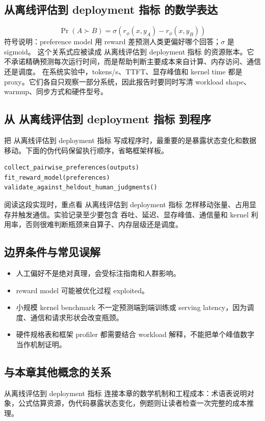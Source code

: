 \documentclass[a4paper]{article}
\begin{document}
\subsection{从离线评估到 deployment 指标 的数学表达}
\[\Pr(A\succ B)=\sigma(r_\phi(x,y_A)-r_\phi(x,y_B))\]
符号说明：preference model 用 reward 差预测人类更偏好哪个回答；\(\sigma\) 是 sigmoid。
这个关系式应被读成 从离线评估到 deployment 指标 的资源账本。它不承诺精确预测每次运行时间，而是帮助判断主要成本来自计算、内存访问、通信还是调度。
在系统实验中，tokens/s、TTFT、显存峰值和 kernel time 都是 proxy。它们各自只观察一部分系统，因此报告时要同时写清 workload shape、warmup、同步方式和硬件型号。
\subsection{从 从离线评估到 deployment 指标 到程序}
把 从离线评估到 deployment 指标 写成程序时，最重要的是暴露状态变化和数据移动。下面的伪代码保留执行顺序，省略框架样板。
\begin{lstlisting}[language=Python]
collect_pairwise_preferences(outputs)
fit_reward_model(preferences)
validate_against_heldout_human_judgments()
\end{lstlisting}
阅读这段实现时，重点看 从离线评估到 deployment 指标 怎样移动张量、占用显存并触发通信。实验记录至少要包含 吞吐、延迟、显存峰值、通信量和 kernel 利用率，否则很难判断瓶颈来自算子、内存层级还是调度。
\subsection{边界条件与常见误解}
\begin{itemize}
\item 人工偏好不是绝对真理，会受标注指南和人群影响。
\item reward model 可能被优化过程 exploited。
\item 小规模 kernel benchmark 不一定预测端到端训练或 serving latency，因为调度、通信和请求形状会改变瓶颈。
\item 硬件规格表和框架 profiler 都需要结合 workload 解释，不能把单个峰值数字当作机制证明。
\end{itemize}
\subsection{与本章其他概念的关系}
从离线评估到 deployment 指标 连接本章的数学机制和工程成本：术语表说明对象，公式估算资源，伪代码暴露状态变化，例题则让读者检查一次完整的成本推理。
\end{document}

